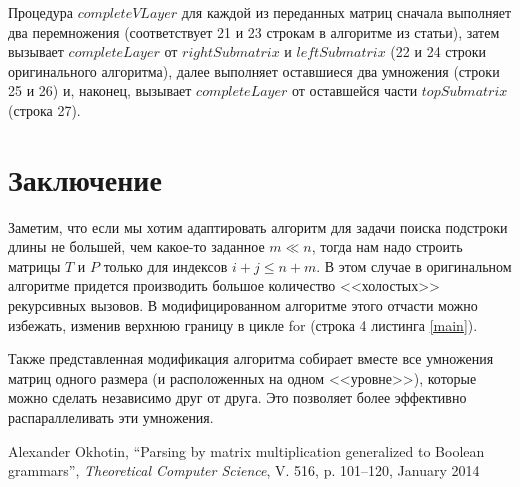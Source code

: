 \documentclass[12pt]{article}  %
\theoremstyle{definition}
\theoremstyle{remark}
\begin{document}
Процедура $completeVLayer$ для каждой из переданных матриц сначала выполняет два перемножения (соответствует 21 и 23 строкам в алгоритме из статьи), затем вызывает $completeLayer$ от $rightSubmatrix$ и $leftSubmatrix$ (22 и 24 строки оригинального алгоритма), далее выполняет оставшиеся два умножения (строки 25 и 26) и, наконец, вызывает $completeLayer$ от оставшейся части $topSubmatrix$ (строка 27).


\section{Заключение}

Заметим, что если мы хотим адаптировать алгоритм для задачи поиска подстроки длины не большей, чем какое-то заданное $m \ll n$, тогда нам надо строить матрицы $T$ и $P$ только для индексов $i + j \leqslant n + m$. В этом случае в оригинальном алгоритме придется производить большое количество <<холостых>> рекурсивных вызовов. В модифицированном алгоритме этого отчасти можно избежать, изменив верхнюю границу в цикле for (строка 4 листинга \ref{main}).

Также представленная модификация алгоритма собирает вместе все умножения матриц одного размера (и расположенных на одном <<уровне>>), которые можно сделать независимо друг от друга. Это позволяет более эффективно распараллеливать эти умножения.

\begin{thebibliography}{9}

  Alexander Okhotin,
  ``Parsing by matrix multiplication generalized to Boolean grammars'',
  \emph{Theoretical Computer Science},
  V. 516,
  p. 101--120,
  January 2014

\end{thebibliography}
\end{document}
